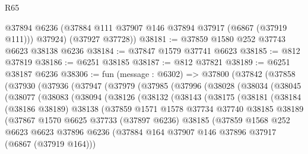 \begin{lexlean}{R65}
\begin{coremodule}
{        @37894
        @6236
        (@37884 @111 @37907 @146 @37894 @37917 (@6867 (@37919 @111)))
        @37924)
      (@37927 @37728))
@38181 := @37859 @1580 @252 @37743 @6623 @38138 @6236
@38184 := @37847 @1579 @37741 @6623
@38185 := @812 @37819
@38186 := @6251 @38185
@38187 := @812 @37821
@38189 := @6251 @38187 @6236
@38306 := fun (message : @6302) =>
  @37800
    (@37842
      (@37858
        (@37930
          (@37936
            (@37947
              (@37979
                (@37985
                  (@37996
                    (@38028
                      (@38034
                        (@38045
                          (@38077
                            (@38083
                              (@38094
                                (@38126
                                  (@38132
                                    (@38143
                                      (@38175
                                        (@38181
                                          (@38184
                                            (@38186 @38189)
                                            @38138
                                            (@37859
                                              @1571
                                              @1578
                                              @37734
                                              @37740
                                              @38185
                                              @38189
                                              (@37867
                                                @1570
                                                @6625
                                                @37733
                                                (@37897 @6236)
                                                @38185
                                                (@37859
                                                  @1568
                                                  @252
                                                  @6623
                                                  @6623
                                                  @37896
                                                  @6236
                                                  (@37884
                                                    @164
                                                    @37907
                                                    @146
                                                    @37896
                                                    @37917
                                                    (@6867 (@37919 @164)))
}
\end{coremodule}
\end{lexlean}
